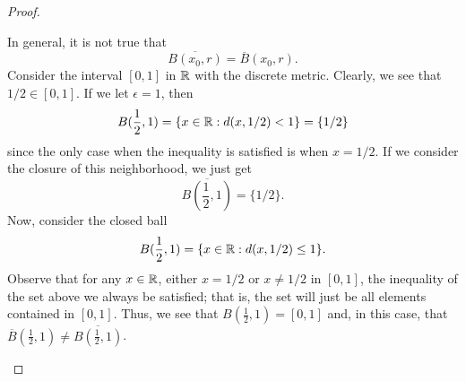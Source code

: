 \documentclass[a4paper]{article}
\begin{document}
\begin{proof}
\begin{enumerate}
        In general, it is not true that 
        \[  \overline{B({x}_{0},r)} = \overline{B}({x}_{0},r). \]
        Consider the interval \( [0,1] \) in \( \mathbb{R}  \) with the discrete metric. Clearly, we see that \( 1/2 \in [0,1] \). If we let \( \epsilon = 1   \), then 
            \[  B(\frac{ 1 }{ 2 } , 1) = \{ x \in \mathbb{R} : d(x,1/2) < 1 \} = \{ 1/2 \}  \]
            since the only case when the inequality is satisfied is when \( x =  1/2  \). If we consider the closure of this neighborhood, we just get 
            \[  \overline{B(\frac{ 1 }{ 2 } ,1)} = \{ 1/2 \}. \]
            Now, consider the closed ball 
            \[   B(\frac{ 1 }{ 2 } ,1) = \{ x \in \mathbb{R} : d(x,1/2) \leq 1  \}. \]
            Observe that for any \( x \in \mathbb{R}  \), either \( x = 1/2 \) or \( x \neq 1/2 \) in \( [0,1] \), the inequality of the set above we always be satisfied; that is, the set will just be all elements contained in \( [0,1]  \). Thus, we see that \( B(\frac{ 1 }{ 2 } ,1) = [0,1] \) and, in this case, that \( \overline{B}(\frac{ 1 }{ 2 } ,1) \neq \overline{B(\frac{ 1 }{ 2 } ,1)} \).  
\end{enumerate} 
\end{proof}
\end{document}
